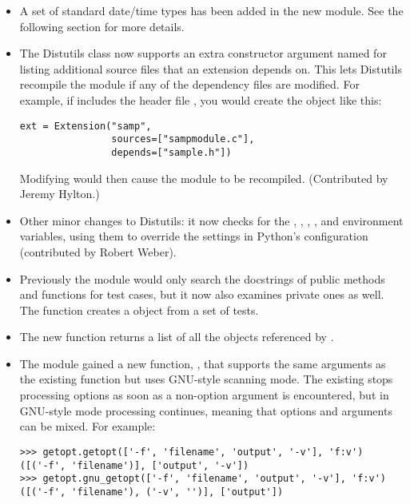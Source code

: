 \documentclass{howto}
\begin{document}
\begin{itemize}
\item A set of standard date/time types has been added in the new 
module.  See the following section for more details.

\item The Distutils  class now supports
an extra constructor argument named  for listing
additional source files that an extension depends on.  This lets
Distutils recompile the module if any of the dependency files are
modified.  For example, if  includes the header
file , you would create the  object like
this:

\begin{verbatim}
ext = Extension("samp",
                sources=["sampmodule.c"],
                depends=["sample.h"])
\end{verbatim}

Modifying  would then cause the module to be recompiled.
(Contributed by Jeremy Hylton.)

\item Other minor changes to Distutils:
it now checks for the , , ,
, and  environment variables, using
them to override the settings in Python's configuration (contributed
by Robert Weber).

\item Previously the  module would only search the
docstrings of public methods and functions for test cases, but it now
also examines private ones as well.  The 
function creates a  object from a set of
 tests.

\item The new  function returns a
list of all the objects referenced by .

\item The  module gained a new function,
, that supports the same arguments as the existing
 function but uses GNU-style scanning mode.
The existing  stops processing options as soon as a
non-option argument is encountered, but in GNU-style mode processing
continues, meaning that options and arguments can be mixed.  For
example:

\begin{verbatim}
>>> getopt.getopt(['-f', 'filename', 'output', '-v'], 'f:v')
([('-f', 'filename')], ['output', '-v'])
>>> getopt.gnu_getopt(['-f', 'filename', 'output', '-v'], 'f:v')
([('-f', 'filename'), ('-v', '')], ['output'])
\end{verbatim}


\end{itemize}
\end{document}
